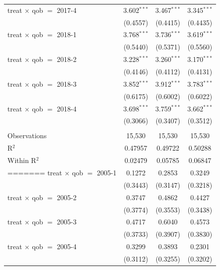 \begin{table}[htbp]
\begin{tabular}{lccc}
      treat $\times$ qob $=$ 2017-4  & 3.602$^{***}$ & 3.467$^{***}$  & 3.345$^{***}$\\   
                                     & (0.4557)      & (0.4415)       & (0.4435)\\   
      treat $\times$ qob $=$ 2018-1  & 3.768$^{***}$ & 3.736$^{***}$  & 3.619$^{***}$\\   
                                     & (0.5440)      & (0.5371)       & (0.5560)\\   
      treat $\times$ qob $=$ 2018-2  & 3.228$^{***}$ & 3.260$^{***}$  & 3.170$^{***}$\\   
                                     & (0.4146)      & (0.4112)       & (0.4131)\\   
      treat $\times$ qob $=$ 2018-3  & 3.852$^{***}$ & 3.912$^{***}$  & 3.783$^{***}$\\   
                                     & (0.6175)      & (0.6002)       & (0.6022)\\   
      treat $\times$ qob $=$ 2018-4  & 3.698$^{***}$ & 3.759$^{***}$  & 3.662$^{***}$\\   
                                     & (0.3066)      & (0.3407)       & (0.3512)\\   
       \\
      Observations                   & 15,530        & 15,530         & 15,530\\  
      R$^2$                          & 0.47957       & 0.49722        & 0.50288\\  
      Within R$^2$                   & 0.02479       & 0.05785        & 0.06847\\  
=======
      treat $\times$ qob $=$ 2005-1  & 0.1272        & 0.2853         & 0.3249\\   
                                     & (0.3443)      & (0.3147)       & (0.3218)\\   
      treat $\times$ qob $=$ 2005-2  & 0.3747        & 0.4862         & 0.4427\\   
                                     & (0.3774)      & (0.3553)       & (0.3438)\\   
      treat $\times$ qob $=$ 2005-3  & 0.4717        & 0.6040         & 0.4573\\   
                                     & (0.3733)      & (0.3907)       & (0.3830)\\   
      treat $\times$ qob $=$ 2005-4  & 0.3299        & 0.3893         & 0.2301\\   
                                     & (0.3112)      & (0.3255)       & (0.3202)\\   

\end{tabular}
\end{table}
